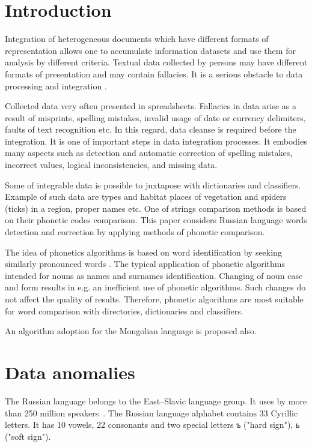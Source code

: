 \documentclass{svproc}
\begin{document}
\section{Introduction}
Integration of heterogeneous documents which have different formats of representation allows one to accumulate information datasets and use them for analysis by different criteria. Textual data collected by persons may have different formats of presentation and may contain fallacies. It is a serious obstacle to data processing and integration  \cite{Storeya-2017}.

Collected data very often presented in spreadsheets. Fallacies in data arise as a result of misprints, spelling mistakes, invalid usage of date or currency delimiters, faults of text recognition etc. In this regard, data cleanse is required before the integration. It is one of important steps in data integration processes. It embodies many aspects such as detection and automatic correction of spelling mistakes, incorrect values, logical inconsistencies, and missing data.

Some of integrable data is possible to juxtapose with dictionaries and classifiers. Example of such data are types and habitat places of vegetation and spiders (ticks) in a region, proper names etc. One of strings comparison methods is based on their phonetic codes comparison. This paper considers Russian language words detection and correction by applying methods of phonetic comparison.

The idea of phonetics algorithms is based on word identification by seeking similarly pronounced words \cite{Parmar-2014}. The typical application of phonetic algorithms intended for nouns as names and surnames \cite{Zahoransky-2015} identification. Changing of noun case and form results in e.g. an inefficient use of phonetic algorithms. Such changes do not affect the quality of results. Therefore, phonetic algorithms are most suitable for word comparison with directories, dictionaries and classifiers.

An algorithm adoption for the Mongolian language is proposed also.

\section{Data anomalies}
The Russian language belongs to the East--Slavic language group. It uses by more than 250 million speakers~\cite{Cubberley-2002}. The Russian language alphabet contains 33 Cyrillic letters. It has 10 vowels, 22 consonants and two special letters ъ ("hard sign"), ь ("soft sign").
\end{document}
